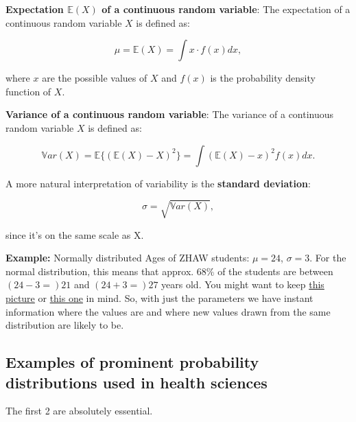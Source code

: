 \documentclass[
]{book}
\begin{document}
\textbf{Expectation \(\mathbb{E}(X)\) of a continuous random variable}: The expectation of a continuous random variable \(X\) is defined as:

\[\mu = \mathbb{E}(X) = \int x \cdot f(x) dx,\]

where \(x\) are the possible values of \(X\) and \(f(x)\) is the probability density function of \(X\).

\textbf{Variance of a continuous random variable}: The variance of a continuous random variable \(X\) is defined as:

\[\mathbb{V}ar(X) = \mathbb{E} \{ (\mathbb{E}(X) - X)^2 \} = \int (\mathbb{E}(X) - x)^2 f(x) dx.\]

A more natural interpretation of variability is the \textbf{standard deviation}:

\[\sigma = \sqrt{\mathbb{V}ar(X)},\]

since it's on the same scale as X.

\textbf{Example:} Normally distributed Ages of ZHAW students: \(\mu = 24\), \(\sigma = 3\). For the normal distribution,
this means that approx. 68\% of the students are between \((24-3=)21\) and \((24+3=)27\) years old.
You might want to keep \href{https://en.wikipedia.org/wiki/Normal_distribution\#/media/File:Standard_deviation_diagram_micro.svg}{this picture}
or \href{https://mathbitsnotebook.com/Algebra2/Statistics/normalstandard.jpg}{this one} in mind.
So, with just the parameters we have instant information where the values are and where new values
drawn from the same distribution are likely to be.

\subsection{Examples of prominent probability distributions used in health sciences}\label{prominent_probability_distributions_in_health_sciences}

The first 2 are absolutely essential.
\end{document}
